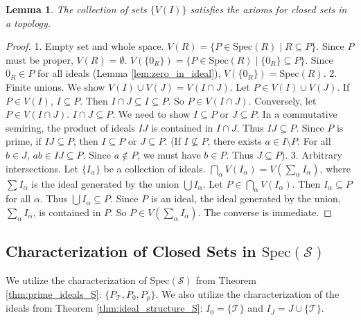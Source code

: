 \documentclass[11pt, a4paper]{article}
\theoremstyle{plain}
\newtheorem{lemma}[theorem]{Lemma}
\theoremstyle{definition}
\numberwithin{equation}{section}
\newcommand{\Tobj}{\mathcal{T}} %
\newcommand{\SemiringS}{\mathcal{S}}
\newcommand{\Spec}{\mathrm{Spec}}
\begin{document}
\begin{lemma}
The collection of sets $\{V(I)\}$ satisfies the axioms for closed sets in a topology.
\end{lemma}
\begin{proof}
1. Empty set and whole space. $V(R) = \{P \in \Spec(R) \mid R \subseteq P\}$. Since $P$ must be proper, $V(R)=\emptyset$. $V(\{0_R\}) = \{P \in \Spec(R) \mid \{0_R\} \subseteq P\}$. Since $0_R \in P$ for all ideals (Lemma \ref{lem:zero_in_ideal}), $V(\{0_R\})=\Spec(R)$.
2. Finite unions. We show $V(I) \cup V(J) = V(I\cap J)$. Let $P \in V(I) \cup V(J)$. If $P \in V(I)$, $I \subseteq P$. Then $I\cap J \subseteq I \subseteq P$. So $P \in V(I\cap J)$. Conversely, let $P \in V(I\cap J)$. $I\cap J \subseteq P$. We need to show $I \subseteq P$ or $J \subseteq P$. In a commutative semiring, the product of ideals $IJ$ is contained in $I\cap J$. Thus $IJ \subseteq P$. Since $P$ is prime, if $IJ \subseteq P$, then $I \subseteq P$ or $J \subseteq P$. (If $I \not\subseteq P$, there exists $a \in I \setminus P$. For all $b \in J$, $ab \in IJ \subseteq P$. Since $a \notin P$, we must have $b \in P$. Thus $J \subseteq P$).
3. Arbitrary intersections. Let $\{I_\alpha\}$ be a collection of ideals. $\bigcap_\alpha V(I_\alpha) = V(\sum_\alpha I_\alpha)$, where $\sum I_\alpha$ is the ideal generated by the union $\bigcup I_\alpha$. Let $P \in \bigcap_\alpha V(I_\alpha)$. Then $I_\alpha \subseteq P$ for all $\alpha$. Thus $\bigcup I_\alpha \subseteq P$. Since $P$ is an ideal, the ideal generated by the union, $\sum_\alpha I_\alpha$, is contained in $P$. So $P \in V(\sum_\alpha I_\alpha)$. The converse is immediate.
\end{proof}

\subsection{Characterization of Closed Sets in \texorpdfstring{$\Spec(\SemiringS)$}{Spec(S)}}

We utilize the characterization of $\Spec(\SemiringS)$ from Theorem \ref{thm:prime_ideals_S}: $\{P_{\Tobj}, P_0, P_p\}$. We also utilize the characterization of the ideals from Theorem \ref{thm:ideal_structure_S}: $I_0=\{\Tobj\}$ and $I_J=J\cup\{\Tobj\}$.
\end{document}
